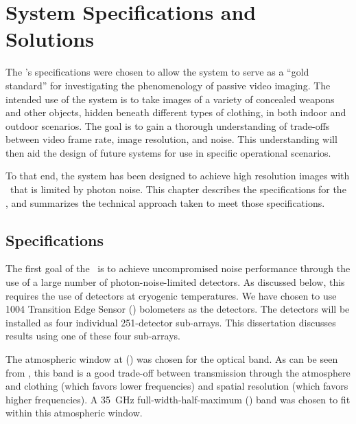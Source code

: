\chapter{System Specifications and Solutions}\label{c:specs}


The \Imager's specifications were chosen to allow the system to serve as a ``gold standard'' for investigating the phenomenology of passive video imaging.
The intended use of the system is to take images of a variety of concealed weapons and other objects, hidden beneath different types of clothing, in both indoor and outdoor scenarios.
The goal is to gain a thorough understanding of trade-offs between video frame rate, image resolution, and noise.
This understanding will then aid the design of future systems for use in specific operational scenarios.

To that end, the system has been designed to achieve high resolution images with \NETD\ that is limited by photon noise.
This chapter describes the specifications for the \Imager, and summarizes the technical approach taken to meet those specifications.

\section{Specifications} \label{sec:ch2-specifications}

The first goal of the \Imager\ is to achieve uncompromised noise performance through the use of a large number of photon-noise-limited detectors.
As discussed below, this requires the use of detectors at cryogenic temperatures.
We have chosen to use 1004 Transition Edge Sensor (\TES) bolometers as the detectors.
The detectors will be installed as four individual 251-detector sub-arrays.
This dissertation discusses results using one of these four sub-arrays.

The atmospheric window at  () was chosen for the optical band.
As can be seen from , this band is a good trade-off between transmission through the atmosphere and clothing (which favors lower frequencies) and spatial resolution (which favors higher frequencies).
A \SI{35}{\GHz} full-width-half-maximum (\FWHM) band was chosen to fit within this atmospheric window.

